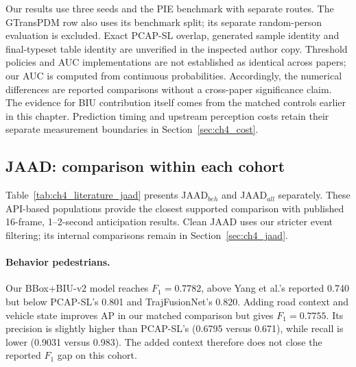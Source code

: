 \begingroup
\setlength{\emergencystretch}{2em}
Our results use three seeds and the PIE benchmark with separate routes. The GTransPDM
row also uses its benchmark split; its separate random-person evaluation is excluded. Exact PCAP-SL overlap,
generated sample identity and final-typeset table identity are unverified in the inspected
author copy. Threshold policies and AUC implementations are not established as identical
across papers; our AUC is computed from continuous probabilities. Accordingly, the
numerical differences are reported comparisons without a cross-paper significance claim.
The evidence for BIU contribution itself comes from the matched controls earlier in this
chapter. Prediction timing and upstream perception costs retain their separate measurement
boundaries in Section~\ref{sec:ch4_cost}.
\par\endgroup

\subsection{JAAD: comparison within each cohort}

Table~\ref{tab:ch4_literature_jaad} presents JAAD$_{beh}$ and JAAD$_{all}$ separately.
These API-based populations provide the closest supported comparison with published
16-frame, 1--2-second anticipation results. Clean JAAD uses our stricter event filtering;
its internal comparisons remain in Section~\ref{sec:ch4_jaad}.



\paragraph{Behavior pedestrians.}
Our BBox+BIU-v2 model reaches $F_1=0.7782$, above Yang et al.'s reported 0.740 but
below PCAP-SL's 0.801 and TrajFusionNet's 0.820. Adding road context and vehicle state
improves AP in our matched comparison but gives $F_1=0.7755$. Its precision is slightly
higher than PCAP-SL's (0.6795 versus 0.671), while recall is lower (0.9031 versus 0.983).
The added context therefore does not close the reported $F_1$ gap on this cohort.

